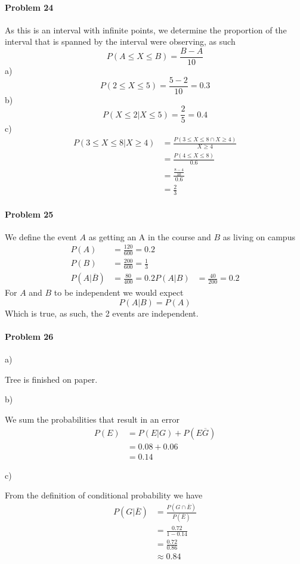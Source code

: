 \paragraph{Problem 24}
As this is an interval with infinite points, we determine the proportion of the interval that is spanned by the interval were observing, as such
\[
    P(A\leq X\leq B)=\frac{B-A}{10}
\]
a)
\[
    P(2\leq X\leq 5)=\frac{5-2}{10}=0.3
\]
b)
\[
    P(X\leq 2|X\leq 5)=\frac{2}{5}=0.4
\]
c)
\begin{align*}
    P(3\leq X\leq 8|X\geq 4)&=\frac{P(3\leq X\leq 8\cap X\geq 4)}{X\geq 4} \\
                   &=\frac{P(4\leq X\leq 8)}{0.6} \\
                   &=\frac{\frac{8-4}{10}}{0.6} \\
                   &=\frac{2}{3}
\end{align*}
\paragraph{Problem 25}
We define the event $A$ as getting an A in the course and $B$ as living on campus
\begin{align*}
    P(A)&=\frac{120}{600}=0.2 \\
    P(B)&=\frac{200}{600}=\frac{1}{3} \\
    P(A|\overline{B})&=\frac{80}{400}=0.2
    P(A|B)&=\frac{40}{200}=0.2
\end{align*}
For $A$ and $B$ to be independent we would expect
\[
    P(A|B)=P(A)
\]
Which is true, as such, the 2 events are independent.
\paragraph{Problem 26}
a)

Tree is finished on paper.

b) 

We sum the probabilities that result in an error
\begin{align*}
    P(E)&=P(E|G)+P(E\overline{G}) \\
        &=0.08+0.06 \\
        &=0.14
\end{align*}

c)

From the definition of conditional probability we have
\begin{align*}
    P(G|\overline{E})&=\frac{P(G\cap\overline{E})}{P(\overline{E})} \\
                     &=\frac{0.72}{1-0.14} \\
                     &=\frac{0.72}{0.86} \\
                     &\approx 0.84
\end{align*}
